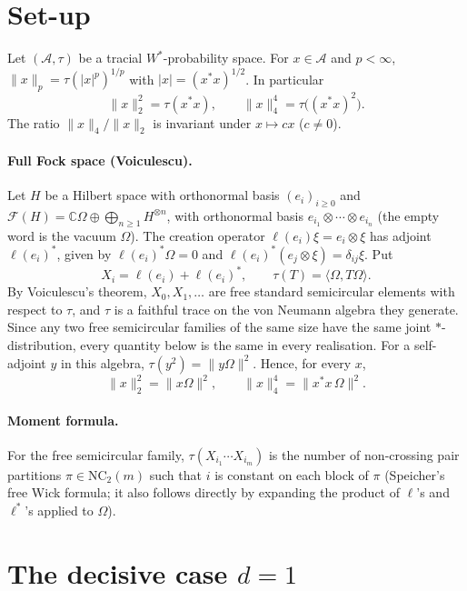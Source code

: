 \documentclass[11pt]{article}
\theoremstyle{definition}
\theoremstyle{remark}
\newcommand{\F}{\mathcal F}
\newcommand{\ip}[2]{\langle #1,#2\rangle}
\newcommand{\NC}{\mathrm{NC}_2}
\begin{document}
\section{Set-up}

Let $(\mathcal A,\tau)$ be a tracial $W^*$-probability space. For $x\in\mathcal A$ and $p<\infty$,
$\|x\|_p=\tau(|x|^p)^{1/p}$ with $|x|=(x^*x)^{1/2}$. In particular
\[
\|x\|_2^2=\tau(x^*x),\qquad \|x\|_4^4=\tau\big((x^*x)^2\big).
\]
The ratio $\|x\|_4/\|x\|_2$ is invariant under $x\mapsto cx$ ($c\neq0$).

\paragraph{Full Fock space (Voiculescu).} Let $H$ be a Hilbert space with orthonormal basis
$(e_i)_{i\ge0}$ and $\F(H)=\mathbb C\Omega\oplus\bigoplus_{n\ge1}H^{\otimes n}$, with orthonormal
basis $e_{i_1}\otimes\cdots\otimes e_{i_n}$ (the empty word is the vacuum $\Omega$). The creation
operator $\ell(e_i)\xi=e_i\otimes\xi$ has adjoint $\ell(e_i)^*$, given by $\ell(e_i)^*\Omega=0$ and
$\ell(e_i)^*(e_j\otimes\xi)=\delta_{ij}\xi$. Put
\[
X_i=\ell(e_i)+\ell(e_i)^*,\qquad \tau(T)=\ip{\Omega}{T\Omega}.
\]
By Voiculescu's theorem, $X_0,X_1,\dots$ are free standard semicircular elements with respect to
$\tau$, and $\tau$ is a faithful trace on the von Neumann algebra they generate. Since any two free
semicircular families of the same size have the same joint $*$-distribution, every quantity
below is the same in every realisation. For a self-adjoint $y$ in this algebra,
$\tau(y^2)=\|y\Omega\|^2$. Hence, for every $x$,
\begin{equation}\label{eq:norms}
\|x\|_2^2=\|x\Omega\|^2,\qquad \|x\|_4^4=\|x^*x\,\Omega\|^2 .
\end{equation}

\paragraph{Moment formula.} For the free semicircular family,
$\tau(X_{i_1}\cdots X_{i_m})$ is the number of non-crossing pair partitions $\pi\in\NC(m)$ such
that $i$ is constant on each block of $\pi$ (Speicher's free Wick formula; it also follows directly
by expanding the product of $\ell$'s and $\ell^*$'s applied to $\Omega$).

\section{The decisive case \texorpdfstring{$d=1$}{d=1}}
\end{document}
